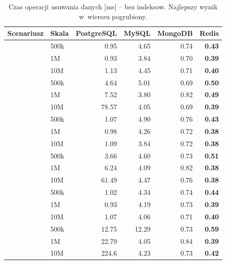 \begin{table}[H]
\centering
\caption{Czas operacji usuwania danych [ms] -- bez indeksow. Najlepszy wynik w~wierszu pogrubiony.}
\label{tab:delete_no}
\small
\begin{tabular}{@{}llrrrr@{}}
\toprule
\textbf{Scenariusz} & \textbf{Skala} & \textbf{PostgreSQL} & \textbf{MySQL} & \textbf{MongoDB} & \textbf{Redis} \\
\midrule
{}
 & 500k & 0.95 & 4.65 & 0.74 & \textbf{0.43} \\
 & 1M & 0.93 & 3.84 & 0.70 & \textbf{0.39} \\
 & 10M & 1.13 & 4.45 & 0.71 & \textbf{0.40} \\
\midrule
{}
 & 500k & 4.64 & 5.01 & 0.69 & \textbf{0.50} \\
 & 1M & 7.52 & 3.80 & 0.82 & \textbf{0.49} \\
 & 10M & 78.57 & 4.05 & 0.69 & \textbf{0.39} \\
\midrule
{}
 & 500k & 1.07 & 4.90 & 0.76 & \textbf{0.43} \\
 & 1M & 0.98 & 4.26 & 0.72 & \textbf{0.38} \\
 & 10M & 1.09 & 3.84 & 0.72 & \textbf{0.38} \\
\midrule
{}
 & 500k & 3.66 & 4.60 & 0.73 & \textbf{0.51} \\
 & 1M & 6.24 & 4.09 & 0.82 & \textbf{0.38} \\
 & 10M & 61.49 & 4.47 & 0.76 & \textbf{0.38} \\
\midrule
{}
 & 500k & 1.02 & 4.34 & 0.74 & \textbf{0.44} \\
 & 1M & 0.93 & 4.19 & 0.73 & \textbf{0.39} \\
 & 10M & 1.07 & 4.06 & 0.71 & \textbf{0.40} \\
\midrule
{}
 & 500k & 12.75 & 12.29 & 0.73 & \textbf{0.59} \\
 & 1M & 22.79 & 4.05 & 0.84 & \textbf{0.39} \\
 & 10M & 224.6 & 4.23 & 0.73 & \textbf{0.42} \\
\bottomrule
\end{tabular}
\end{table}
